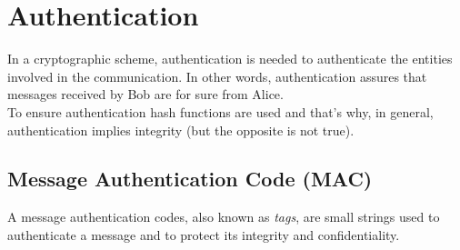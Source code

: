 \section{Authentication}
In a cryptographic scheme, authentication is needed to authenticate the entities involved in the communication. In other words, authentication assures that messages received by Bob are for sure from Alice.\\
To ensure authentication hash functions are used and that's why, in general, authentication implies integrity (but the opposite is not true).

\subsection{Message Authentication Code (MAC)}
A message authentication codes, also known as \emph{tags}, are small strings used to authenticate a message and to protect its integrity and confidentiality.\\
